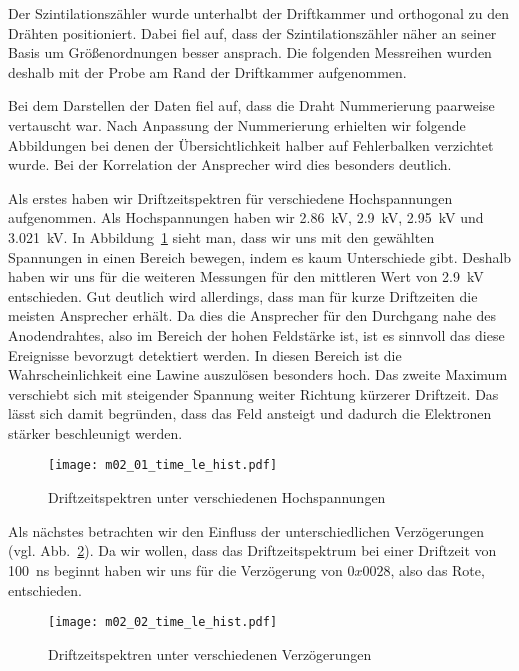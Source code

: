 \documentclass[11pt, ngerman, fleqn, DIV=15, headinclude, BCOR=2cm]{scrreprt}
\begin{document}
Der Szintilationszähler wurde unterhalbt der Driftkammer und orthogonal zu
den Drähten positioniert.
Dabei fiel auf, dass der Szintilationszähler näher an seiner Basis um
Größenordnungen  besser ansprach.
Die folgenden Messreihen wurden deshalb mit der Probe am Rand der
Driftkammer aufgenommen.

Bei dem Darstellen der Daten fiel auf, dass die Draht Nummerierung paarweise
vertauscht war.
Nach Anpassung der Nummerierung erhielten wir folgende Abbildungen bei denen der
Übersichtlichkeit halber auf Fehlerbalken verzichtet wurde.
Bei der Korrelation der Ansprecher wird dies besonders deutlich.

Als erstes haben wir Driftzeitspektren für verschiedene Hochspannungen
aufgenommen.
Als Hochspannungen haben wir \SI{2,86}{\kilo\volt},
\SI{2,9}{\kilo\volt}, \SI{2,95}{\kilo\volt} und \SI{3,021}{\kilo\volt}.
In Abbildung~\ref{fig:m02_01_driftzeitspektrum} sieht man, dass wir uns mit den
gewählten Spannungen in einen Bereich bewegen, indem es kaum Unterschiede gibt.
Deshalb haben wir uns für die weiteren Messungen für den mittleren Wert von
\SI{2,9}{\kilo\volt} entschieden.
Gut deutlich wird allerdings, dass man für kurze Driftzeiten die meisten
Ansprecher erhält. Da dies die Ansprecher für den Durchgang nahe des
Anodendrahtes, also im Bereich der hohen Feldstärke ist, ist es sinnvoll das
diese Ereignisse bevorzugt detektiert werden.
In diesen Bereich ist die Wahrscheinlichkeit eine Lawine auszulösen
besonders hoch.
Das zweite Maximum verschiebt sich mit steigender Spannung
weiter Richtung kürzerer Driftzeit. Das lässt sich damit begründen, dass das
Feld ansteigt und dadurch die Elektronen stärker beschleunigt werden.

\begin{figure}
    \centering
    \texttt{[image: m02\_01\_time\_le\_hist.pdf]}
    \caption{%
	    Driftzeitspektren unter verschiedenen Hochspannungen
   }
    \label{fig:m02_01_driftzeitspektrum}
\end{figure}

Als nächstes betrachten wir den Einfluss der unterschiedlichen Verzögerungen
(vgl. Abb.~\ref{fig:m02_02_driftzeitspektrum}).
Da wir wollen, dass das Driftzeitspektrum bei einer Driftzeit von
\SI{100}{\nano\second} beginnt haben wir uns für die Verzögerung von
$0x0028$, also das Rote, entschieden.

\begin{figure}
    \centering
    \texttt{[image: m02\_02\_time\_le\_hist.pdf]}
    \caption{%
	    Driftzeitspektren unter verschiedenen Verzögerungen
   }
    \label{fig:m02_02_driftzeitspektrum}
\end{figure}
\end{document}
